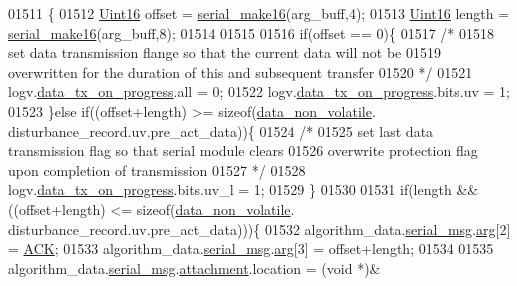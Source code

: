 \begin{DoxyCode}
{{{{{01511                 \{
01512                     \hyperlink{a00072_a59a9f6be4562c327cbfb4f7e8e18f08b}{Uint16} offset = \hyperlink{a00031_abc17de32f14103a5be219df0d4ad9176}{serial\_make16}(arg\_buff,4);
01513                     \hyperlink{a00072_a59a9f6be4562c327cbfb4f7e8e18f08b}{Uint16} length = \hyperlink{a00031_abc17de32f14103a5be219df0d4ad9176}{serial\_make16}(arg\_buff,8);
01514 
01515 
01516                     \textcolor{keywordflow}{if}(offset == 0)\{
01517                         \textcolor{comment}{/*}
01518 \textcolor{comment}{                         set data transmission flange so that the current data will not be}
01519 \textcolor{comment}{                         overwritten for the duration of this and subsequent transfer}
01520 \textcolor{comment}{                       */}
01521                         logv.\hyperlink{a00021_a6cdefde69642ef511e3252c38be68516}{data\_tx\_on\_progress}.all       = 0;
01522                         logv.\hyperlink{a00021_a6cdefde69642ef511e3252c38be68516}{data\_tx\_on\_progress}.bits.uv   = 1;
01523                     \}\textcolor{keywordflow}{else} \textcolor{keywordflow}{if}((offset+length) >= \textcolor{keyword}{sizeof}(\hyperlink{a00060_a76ac5f917f5308dcd83de0d7c94559fb}{data\_non\_volatile}.
      disturbance\_record.uv.pre\_act\_data))\{
01524                         \textcolor{comment}{/*}
01525 \textcolor{comment}{                         set last data transmission flag so that serial module clears}
01526 \textcolor{comment}{                         overwrite protection flag upon completion of transmission}
01527 \textcolor{comment}{                       */}
01528                         logv.\hyperlink{a00021_a6cdefde69642ef511e3252c38be68516}{data\_tx\_on\_progress}.bits.uv\_l = 1;
01529                     \}
01530 
01531                    \textcolor{keywordflow}{if}(length && ((offset+length) <= \textcolor{keyword}{sizeof}(\hyperlink{a00060_a76ac5f917f5308dcd83de0d7c94559fb}{data\_non\_volatile}.
      disturbance\_record.uv.pre\_act\_data)))\{
01532                        algorithm\_data.\hyperlink{a00016_afcf5f557aea688aad985eec15269c1da}{serial\_msg}.\hyperlink{a00031_af7d6f762438c80072bd9dc0e4dd4ae1e}{arg}[2]                 = 
      \hyperlink{a00021_a6f6489887e08bff4887d0bc5dcf214d8}{ACK};
01533                        algorithm\_data.\hyperlink{a00016_afcf5f557aea688aad985eec15269c1da}{serial\_msg}.\hyperlink{a00031_af7d6f762438c80072bd9dc0e4dd4ae1e}{arg}[3]                 = offset+length;
01534 
01535                        algorithm\_data.\hyperlink{a00016_afcf5f557aea688aad985eec15269c1da}{serial\_msg}.\hyperlink{a00031_a040f6d5d58d18d8aeaf447eda7f50172}{attachment}.location    = (\textcolor{keywordtype}{void} *)&
}}}}}
\end{DoxyCode}
